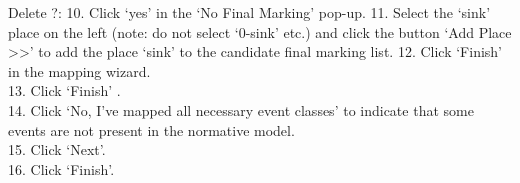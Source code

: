 \documentclass[]{article}
\begin{document}
Delete ?: 10. Click `yes' in the `No Final Marking' pop-up. 11. Select
the `sink' place on the left (note: do not select `0-sink' etc.) and
click the button `Add Place \textgreater{}\textgreater{}' to add the
place `sink' to the candidate final marking list. 12. Click `Finish' in
the mapping wizard.\\13. Click `Finish' .\\14. Click `No, I've mapped
all necessary event classes' to indicate that some events are not
present in the normative model.\\15. Click `Next'.\\16. Click `Finish'.
\end{document}
